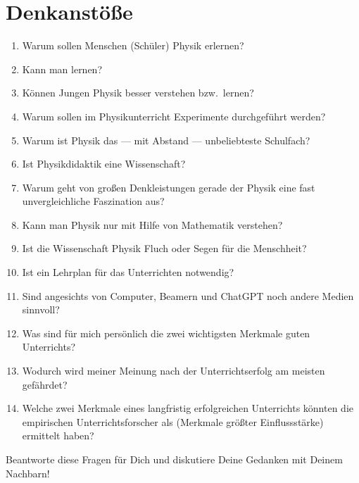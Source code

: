 \chapter{Denkanstöße}\label{Denk}

\begin{enumerate}[label=Q\arabic*:]
	\item
	Warum sollen Menschen (Sch\"{u}ler) Physik erlernen?
	\item
	Kann man  lernen?
	\item
	K\"{o}nnen Jungen Physik besser verstehen bzw.\ lernen?
	\item
	Warum sollen im Physikunterricht Experimente durchgef\"{u}hrt werden?
	\item
	Warum ist Physik das --- mit Abstand --- unbeliebteste Schulfach?
	\item
	Ist Physikdidaktik eine Wissenschaft?
	\item
	Warum geht von gro{\ss}en Denkleistungen gerade der Physik eine fast unvergleichliche Faszination aus?
	\item
	Kann man Physik nur mit Hilfe von Mathematik verstehen?
	\item
	Ist die Wissenschaft Physik Fluch oder Segen f\"{u}r die Menschheit?
	\item
	Ist ein Lehrplan f\"{u}r das Unterrichten notwendig?
	\item Sind angesichts von Computer, Beamern und ChatGPT  noch andere Medien sinnvoll?
	\item Was sind für mich persönlich die zwei wichtigsten Merkmale guten Unterrichts?
	\item Wodurch wird meiner Meinung nach der Unterrichtserfolg am meisten gefährdet?
	\item Welche zwei Merkmale eines langfristig erfolgreichen Unterrichts könnten die empirischen Unterrichtsforscher als  (Merkmale größter Einflussstärke) ermittelt haben?
\end{enumerate}

\begin{uea}
	Beantworte diese Fragen für Dich und diskutiere Deine Gedanken mit Deinem Nachbarn!
\end{uea}